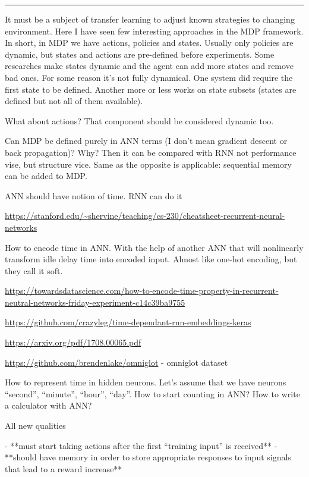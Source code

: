 \documentclass[draft]{article}
\begin{document}
\medskip\hrule\medskip

It must be a subject of transfer learning to adjust known strategies to changing environment. Here I have seen few interesting approaches in the MDP framework. In short, in MDP we have actions, policies and states. Usually only policies are dynamic, but states and actions are pre-defined before experiments. Some researches make states dynamic and the agent can add more states and remove bad ones. For some reason it’s not fully dynamical. One system did require the first state to be defined. Another more or less works on state subsets (states are defined but not all of them available).


What about actions? That component should be considered dynamic too.

Can MDP be defined purely in ANN terms (I don’t mean gradient descent or back propagation)? Why? Then it can be compared with RNN not performance vise, but structure vice. Same as the opposite is applicable: sequential memory can be added to MDP.


ANN should have notion of time. RNN can do it

\url{https://stanford.edu/~shervine/teaching/cs-230/cheatsheet-recurrent-neural-networks}

How to encode time in ANN. With the help of another ANN that will nonlinearly transform idle delay time into encoded input. Almost like one-hot encoding, but they call it soft.

\url{https://towardsdatascience.com/how-to-encode-time-property-in-recurrent-neutral-networks-friday-experiment-c14c39ba9755}

\url{https://github.com/crazyleg/time-dependant-rnn-embeddings-keras}

\url{https://arxiv.org/pdf/1708.00065.pdf}

\url{https://github.com/brendenlake/omniglot} - omniglot dataset

How to represent time in hidden neurons. Let’s assume that we have neurons “second”, “minute”, “hour”, “day”. How to start counting in ANN? How to write a calculator with ANN?

All new qualities

- **must start taking actions after the first “training input” is received**
- **should have memory in order to store appropriate responses to input signals that lead to a reward increase**




\end{document}
